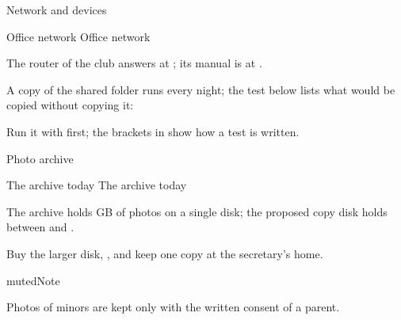 \documentclass[a4paper,11pt]{article}
\begin{document}
{Network and devices}

{Office network}
{Office network}

The router of the club answers at ;
its manual is at .
\par

A copy of the shared folder runs every night; the test below lists what would be
copied without copying it:
\par
\begin{RdListing}
\end{RdListing}
\begin{RdSmall}

Run it with  first; the brackets in 
show how a test is written.
\par
\end{RdSmall}

{Photo archive}

{The archive today}
{The archive today}

 The archive holds  GB of photos on a
single disk; the proposed copy disk holds between  and .
\par

 Buy the larger disk, , and keep one copy
at the secretary’s home.
\par
\begin{RdBox}{muted}{Note}

Photos of minors are kept only with the written consent of a parent.
\par
\end{RdBox}
\end{document}
